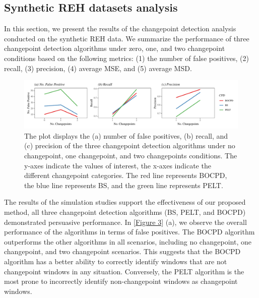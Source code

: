 \documentclass[]{interact}
\theoremstyle{plain}%
\theoremstyle{definition}
\theoremstyle{remark}
\begin{document}
{	\subsection{Synthetic REH datasets analysis} \label{res:simulation}
	
	\hspace{0.28cm} In this section, we present the results of the changepoint detection analysis conducted on the synthetic REH data. We summarize the performance of three changepoint detection algorithms under zero, one, and two changepoint conditions based on the following metrics: (1) the number of false positives, (2) recall, (3) precision, (4) average MSE, and (5) average MSD.
	
	\begin{figure}[h]
		\captionsetup{justification=raggedright}
		\renewcommand{\figurename}{Figure}
		\centering
		\includegraphics[width=\textwidth,height=\textheight,keepaspectratio]{FPTPRPPV}
		\caption{\fontsize{8}{10}\selectfont The plot displays the (a) number of false positives, (b) recall, and (c) precision of the three changepoint detection algorithms under no changepoint, one changepoint, and two changepoints conditions. The y-axes indicate the values of interest, the x-axes indicate the different changepoint categories. The red line represents BOCPD, the blue line represents BS, and the green line represents PELT.}
		\label{Figure 3}
	\end{figure}
	
	The results of the simulation studies support the effectiveness of our proposed method, all three changepoint detection algorithms (BS, PELT, and BOCPD) demonstrated persuasive performance. In \autoref{Figure 3} (a), we observe the overall performance of the algorithms in terms of false positives. The BOCPD algorithm outperforms the other algorithms in all scenarios, including no changepoint, one changepoint, and two changepoint scenarios. This suggests that the BOCPD algorithm has a better ability to correctly identify windows that are not changepoint windows in any situation. Conversely, the PELT algorithm is the most prone to incorrectly identify non-changepoint windows as changepoint windows. \\
	
}
\end{document}
